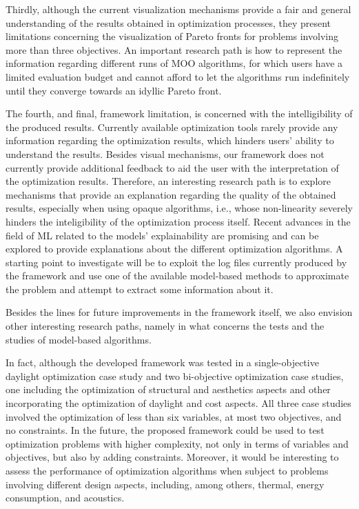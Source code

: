 Thirdly, although the current visualization mechanisms provide a fair and general understanding of the results obtained in optimization processes, they present limitations concerning the visualization of Pareto fronts for problems involving more than three objectives. An important research path is how to represent the information regarding different runs of \ac{MOO} algorithms, for which users have a limited evaluation budget and cannot afford to let the algorithms run indefinitely until they converge towards an idyllic Pareto front. %

The fourth, and final, framework limitation, is concerned with the intelligibility of the produced results. Currently available optimization tools rarely provide any information regarding the optimization results, which hinders users' ability to understand the results. Besides visual mechanisms, our framework does not currently provide additional feedback to aid the user with the interpretation of the optimization results. Therefore, an interesting research path is to explore mechanisms that provide an explanation regarding the quality of the obtained results, especially when using opaque algorithms, i.e., whose non-linearity severely hinders the inteligibility of the optimization process itself. Recent advances in the field of \ac{ML} related to the models' explainability are promising and can be explored to provide explanations about the different optimization algorithms. A starting point to investigate will be to exploit the log files currently produced by the framework and use one of the available model-based methods to approximate the problem and attempt to extract some information about it.

Besides the lines for future improvements in the framework itself, we also envision other interesting research paths, namely in what concerns the tests and the studies of model-based algorithms. 

In fact, although the developed framework was tested in a single-objective daylight optimization case study and two bi-objective optimization case studies, one including the optimization of structural and aesthetics aspects and other incorporating the optimization of daylight and cost aspects. All three case studies involved the optimization of less than six variables, at most two objectives, and no constraints. In the future, the proposed framework could be used to test optimization problems with higher complexity, not only in terms of variables and objectives, but also by adding constraints. Moreover, it would be interesting to assess the performance of optimization algorithms when subject to problems involving different design aspects, including, among others, thermal, energy consumption, and acoustics. 
 

